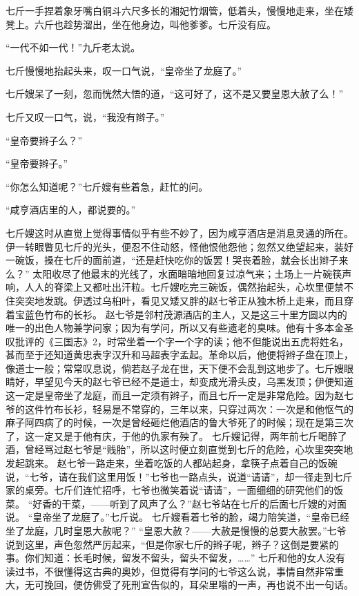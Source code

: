 \documentclass[12pt,UTF8]{ctexbook}
\begin{document}
七斤一手捏着象牙嘴白铜斗六尺多长的湘妃竹烟管，低着头，慢慢地走来，坐在矮凳上。六斤也趁势溜出，坐在他身边，叫他爹爹。七斤没有应。

“一代不如一代！”九斤老太说。

七斤慢慢地抬起头来，叹一口气说，“皇帝坐了龙庭了。”

七斤嫂呆了一刻，忽而恍然大悟的道，“这可好了，这不是又要皇恩大赦了么！”

七斤又叹一口气，说，“我没有辫子。”

“皇帝要辫子么？”

“皇帝要辫子。”

“你怎么知道呢？”七斤嫂有些着急，赶忙的问。

“咸亨酒店里的人，都说要的。”

七斤嫂这时从直觉上觉得事情似乎有些不妙了，因为咸亨酒店是消息灵通的所在。伊一转眼瞥见七斤的光头，便忍不住动怒，怪他恨他怨他；忽然又绝望起来，装好一碗饭，搡在七斤的面前道，“还是赶快吃你的饭罢！哭丧着脸，就会长出辫子来么？”
太阳收尽了他最末的光线了，水面暗暗地回复过凉气来；土场上一片碗筷声响，人人的脊梁上又都吐出汗粒。七斤嫂吃完三碗饭，偶然抬起头，心坎里便禁不住突突地发跳。伊透过乌桕叶，看见又矮又胖的赵七爷正从独木桥上走来，而且穿着宝蓝色竹布的长衫。
赵七爷是邻村茂源酒店的主人，又是这三十里方圆以内的唯一的出色人物兼学问家；因为有学问，所以又有些遗老的臭味。他有十多本金圣叹批评的《三国志》2，时常坐着一个字一个字的读；他不但能说出五虎将姓名，甚而至于还知道黄忠表字汉升和马超表字孟起。革命以后，他便将辫子盘在顶上，像道士一般；常常叹息说，倘若赵子龙在世，天下便不会乱到这地步了。七斤嫂眼睛好，早望见今天的赵七爷已经不是道士，却变成光滑头皮，乌黑发顶；伊便知道这一定是皇帝坐了龙庭，而且一定须有辫子，而且七斤一定是非常危险。因为赵七爷的这件竹布长衫，轻易是不常穿的，三年以来，只穿过两次：一次是和他怄气的麻子阿四病了的时候，一次是曾经砸烂他酒店的鲁大爷死了的时候；现在是第三次了，这一定又是于他有庆，于他的仇家有殃了。
七斤嫂记得，两年前七斤喝醉了酒，曾经骂过赵七爷是“贱胎”，所以这时便立刻直觉到七斤的危险，心坎里突突地发起跳来。
赵七爷一路走来，坐着吃饭的人都站起身，拿筷子点着自己的饭碗说，“七爷，请在我们这里用饭！”七爷也一路点头，说道“请请”，却一径走到七斤家的桌旁。七斤们连忙招呼，七爷也微笑着说“请请”，一面细细的研究他们的饭菜。
“好香的干菜，——听到了风声了么？”赵七爷站在七斤的后面七斤嫂的对面说。
“皇帝坐了龙庭了。”七斤说。
七斤嫂看着七爷的脸，竭力陪笑道，“皇帝已经坐了龙庭，几时皇恩大赦呢？”
“皇恩大赦？——大赦是慢慢的总要大赦罢。”七爷说到这里，声色忽然严厉起来，“但是你家七斤的辫子呢，辫子？这倒是要紧的事。你们知道：长毛时候，留发不留头，留头不留发，……”
七斤和他的女人没有读过书，不很懂得这古典的奥妙，但觉得有学问的七爷这么说，事情自然非常重大，无可挽回，便仿佛受了死刑宣告似的，耳朵里嗡的一声，再也说不出一句话。
\end{document}
